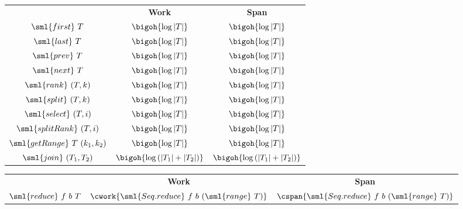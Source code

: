 \begin{cluster}
\label{grp:cst:treap-table::ordered-table-operations}

\begin{costspec}
\label{cst:treap-table::ordered-table-operations}
\begin{tabular}{c|c|c}
& \textbf{Work} & \textbf{Span} \\
$\sml{first}~T$ & $\bigoh{\log|T|}$ & $\bigoh{\log|T|}$ \\
$\sml{last}~T$ & $\bigoh{\log|T|}$ & $\bigoh{\log|T|}$ \\
$\sml{prev}~T$ & $\bigoh{\log|T|}$ & $\bigoh{\log|T|}$ \\
$\sml{next}~T$ & $\bigoh{\log|T|}$ & $\bigoh{\log|T|}$ \\
$\sml{rank}~(T, k)$ & $\bigoh{\log|T|}$ & $\bigoh{\log|T|}$ \\
$\sml{split}~(T, k)$ & $\bigoh{\log|T|}$ & $\bigoh{\log|T|}$ \\
$\sml{select}~(T, i)$ & $\bigoh{\log|T|}$ & $\bigoh{\log|T|}$ \\
$\sml{splitRank}~(T, i)$ & $\bigoh{\log|T|}$ & $\bigoh{\log|T|}$ \\
$\sml{getRange}~T~(k_1, k_2)$ & $\bigoh{\log|T|}$ & $\bigoh{\log|T|}$
\\
$\sml{join}~(T_1, T_2)$ &
$\bigoh{\log\left(|T_1| + |T_2|\right)}$ &
$\bigoh{\log\left(|T_1| + |T_2|\right)}$
\end{tabular}

\end{costspec}
\end{cluster}

\begin{cluster}
\label{grp:cst:treap-table::reduce}

\begin{costspec}[Reduce]
\label{cst:treap-table::reduce}
\begin{tabular}{c|c|c}
& \textbf{Work} & \textbf{Span} \\
$\sml{reduce}~f~b~T$ &
$\cwork{\sml{Seq.reduce}~f~b~(\sml{range}~T)}$ &
$\cspan{\sml{Seq.reduce}~f~b~(\sml{range}~T)}$
\end{tabular}

\end{costspec}
\end{cluster}


